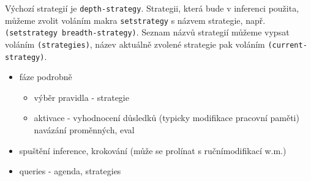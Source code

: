 Výchozí strategií je \verb|depth-strategy|. Strategii, která bude v inferenci
použita, můžeme zvolit voláním makra \verb|setstrategy| s názvem strategie,
např. \verb|(setstrategy breadth-strategy)|. Seznam názvů strategií můžeme
vypsat voláním \verb|(strategies)|, název aktuálně zvolené strategie pak voláním
\verb|(current-strategy)|.

\begin{framed}
  \begin{itemize}
    \item fáze podrobně
    \begin{itemize}
      \item výběr pravidla - strategie
      \item aktivace - vyhodnocení důsledků (typicky modifikace pracovní paměti)
        navázání proměnných, eval
    \end{itemize}
    \item spuštění inference, krokování (může se prolínat s ručnímodifikací w.m.)
    \item queries - agenda, strategies
  \end{itemize}
\end{framed}
